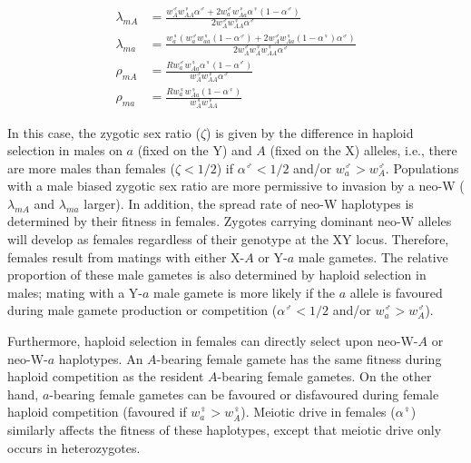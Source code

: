 \documentclass[12pt]{article}
\begin{document}
\begin{subequations}\label{Binvasion}
\begin{align}
\lambda_{mA}&=\frac{w_{A}^\male w_{AA}^\female \alpha^\male + 2 w_{a}^\male w_{Aa}^\female \alpha^\female(1-\alpha^\male)}{2w_{A}^\male  w_{AA}^\female \alpha^\male} \\
\lambda_{ma}&=\frac{w_{a}^\female(w_{a}^\male w_{aa}^\female (1-\alpha^\male) + 2 w_{A}^\male w_{Aa}^\female(1-\alpha^\female)\alpha^\male)}{2w_{A}^\male w_{A}^\female w_{AA}^\female \alpha^\male} \\
\rho_{mA}&= \frac{R w_{a}^\male w_{Aa}^\female \alpha^\female(1-\alpha^\male)}{w_{A}^\male w_{AA}^
\female \alpha^\male} \\
\rho_{ma}&= \frac{R w_{a}^\female w_{Aa}^\female (1-\alpha^\female)}{w_{A}^\female w_{AA}^
\female} 
\end{align}
\end{subequations}

\noindent
In this case, the zygotic sex ratio ($\zeta$) is given by the difference in haploid selection in males on $a$ (fixed on the Y) and $A$ (fixed on the X) alleles, i.e., there are more males than females ($\zeta<1/2$) if $\alpha^\male<1/2$ and/or $w_{a}^\male>w_{A}^\male$. 
Populations with a male biased zygotic sex ratio are more permissive to invasion by a neo-W ($\lambda_{mA}$ and $\lambda_{ma}$ larger).
In addition, the spread rate of neo-W haplotypes is determined by their fitness in females. 
Zygotes carrying dominant neo-W alleles will develop as females regardless of their genotype at the XY locus. Therefore, females result from matings with either X-$A$ or Y-$a$ male gametes. 
The relative proportion of these male gametes is also determined by haploid selection in males; mating with a Y-$a$ male gamete is more likely if the $a$ allele is favoured during male gamete production or competition ($\alpha^\male<1/2$ and/or $w_{a}^\male>w_{A}^\male$). 

Furthermore, haploid selection in females can directly select upon neo-W-$A$ or neo-W-$a$ haplotypes. 
An $A$-bearing female gamete has the same fitness during haploid competition as the resident $A$-bearing female gametes. 
On the other hand, $a$-bearing female gametes can be favoured or disfavoured during female haploid competition (favoured if $w_{a}^\female>w_{A}^\female$). 
Meiotic drive in females ($\alpha^\female$) similarly affects the fitness of these haplotypes, except that meiotic drive only occurs in heterozygotes. 
\end{document}
